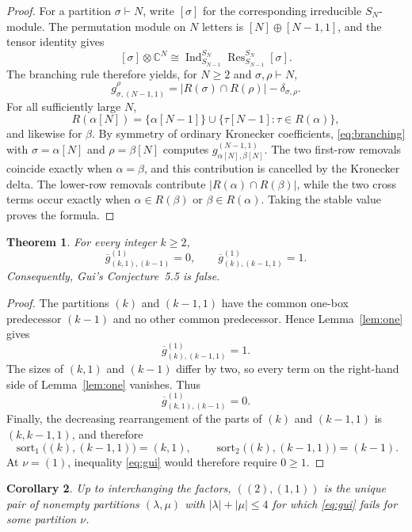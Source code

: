 \documentclass[11pt]{amsart}
\newtheorem{theorem}{Theorem}
\newtheorem{corollary}[theorem]{Corollary}
\newcommand{\sort}{\operatorname{sort}}
\begin{document}
\begin{proof}
For a partition $\sigma\vdash N$, write $[\sigma]$ for the corresponding
irreducible $S_N$-module.  The permutation module on $N$ letters is
$[N]\oplus[N-1,1]$, and the tensor identity gives
\[
  [\sigma]\otimes\mathbb C^N
  \cong
  \operatorname{Ind}_{S_{N-1}}^{S_N}
  \operatorname{Res}_{S_{N-1}}^{S_N}[\sigma].
\]
The branching rule therefore yields, for $N\ge2$ and
$\sigma,\rho\vdash N$,
\begin{equation}\label{eq:branching}
  g_{\sigma,(N-1,1)}^{\rho}
  =|R(\sigma)\cap R(\rho)|-\delta_{\sigma,\rho}.
\end{equation}
For all sufficiently large $N$,
\[
  R(\alpha[N])
  =\{\alpha[N-1]\}\cup
    \{\tau[N-1]:\tau\in R(\alpha)\},
\]
and likewise for $\beta$.  By symmetry of ordinary Kronecker coefficients,
\eqref{eq:branching} with $\sigma=\alpha[N]$ and $\rho=\beta[N]$ computes
$g_{\alpha[N],\beta[N]}^{(N-1,1)}$.  The two first-row removals coincide
exactly when $\alpha=\beta$, and this contribution is cancelled by the
Kronecker delta.  The lower-row removals contribute
$|R(\alpha)\cap R(\beta)|$, while the two cross terms occur exactly when
$\alpha\in R(\beta)$ or $\beta\in R(\alpha)$.  Taking the stable value proves
the formula.
\end{proof}

\begin{theorem}\label{thm:main}
For every integer $k\ge2$,
\[
  \overline g_{(k,1),(k-1)}^{(1)}=0,
  \qquad
  \overline g_{(k),(k-1,1)}^{(1)}=1.
\]
Consequently, Gui's Conjecture~5.5 is false.
\end{theorem}

\begin{proof}
The partitions $(k)$ and $(k-1,1)$ have the common one-box predecessor
$(k-1)$ and no other common predecessor.  Hence Lemma~\ref{lem:one} gives
\[
  \overline g_{(k),(k-1,1)}^{(1)}=1.
\]
The sizes of $(k,1)$ and $(k-1)$ differ by two, so every term on the
right-hand side of Lemma~\ref{lem:one} vanishes.  Thus
\[
  \overline g_{(k,1),(k-1)}^{(1)}=0.
\]
Finally, the decreasing rearrangement of the parts of $(k)$ and $(k-1,1)$ is
$(k,k-1,1)$, and therefore
\[
  \sort_1\bigl((k),(k-1,1)\bigr)=(k,1),
  \qquad
  \sort_2\bigl((k),(k-1,1)\bigr)=(k-1).
\]
At $\nu=(1)$, inequality \eqref{eq:gui} would therefore require $0\ge1$.
\end{proof}

\begin{corollary}\label{cor:minimal}
Up to interchanging the factors, $((2),(1,1))$ is the unique pair of nonempty
partitions $(\lambda,\mu)$ with $|\lambda|+|\mu|\le4$ for which
\eqref{eq:gui} fails for some partition $\nu$.
\end{corollary}
\end{document}
